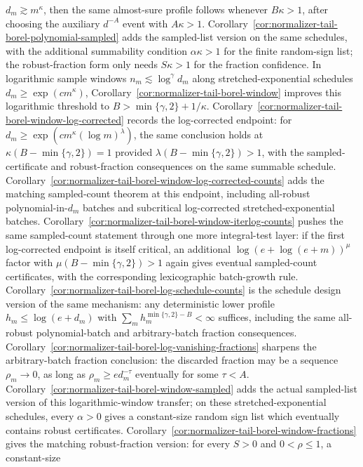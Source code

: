 \documentclass[11pt]{amsart}
\numberwithin{equation}{section}
\theoremstyle{definition}
\theoremstyle{remark}
\begin{document}
\(d_m\gtrsim m^\kappa\), then the same almost-sure profile follows whenever
\(B\kappa>1\), after choosing the auxiliary \(d^{-A}\) event with
\(A\kappa>1\).  Corollary~\ref{cor:normalizer-tail-borel-polynomial-sampled}
adds the sampled-list version on the same schedules, with the additional
summability condition \(\alpha\kappa>1\) for the finite random-sign list; the
robust-fraction form only needs \(S\kappa>1\) for the fraction confidence.  In
logarithmic sample windows \(n_m\lesssim\log^\gamma d_m\) along
stretched-exponential schedules \(d_m\ge\exp(c m^\kappa)\),
Corollary~\ref{cor:normalizer-tail-borel-window} improves this logarithmic
threshold to \(B>\min\{\gamma,2\}+1/\kappa\).
Corollary~\ref{cor:normalizer-tail-borel-window-log-corrected} records the
log-corrected endpoint: for
\(d_m\ge\exp(c m^\kappa(\log m)^\lambda)\), the same conclusion holds at
\(\kappa(B-\min\{\gamma,2\})=1\) provided
\(\lambda(B-\min\{\gamma,2\})>1\), with the sampled-certificate and
robust-fraction consequences on the same summable schedule.
Corollary~\ref{cor:normalizer-tail-borel-window-log-corrected-counts} adds the
matching sampled-count theorem at this endpoint, including all-robust
polynomial-in-\(d_m\) batches and subcritical log-corrected
stretched-exponential batches.
Corollary~\ref{cor:normalizer-tail-borel-window-iterlog-counts} pushes the same
sampled-count statement through one more integral-test layer:
if the first log-corrected endpoint is itself critical, an additional
\(\log(e+\log(e+m))^\mu\) factor with \(\mu(B-\min\{\gamma,2\})>1\) again gives
eventual sampled-count certificates, with the corresponding lexicographic
batch-growth rule.
Corollary~\ref{cor:normalizer-tail-borel-log-schedule-counts} is the schedule
design version of the same mechanism: any deterministic lower profile
\(h_m\le\log(e+d_m)\) with
\(\sum_m h_m^{\min\{\gamma,2\}-B}<\infty\) suffices, including the same
all-robust polynomial-batch and arbitrary-batch fraction consequences.
Corollary~\ref{cor:normalizer-tail-borel-log-vanishing-fractions} sharpens the
arbitrary-batch fraction conclusion: the discarded fraction may be a sequence
\(\rho_m\to0\), as long as \(\rho_m\ge e d_m^{-\tau}\) eventually for some
\(\tau<A\).
Corollary~\ref{cor:normalizer-tail-borel-window-sampled} adds the actual
sampled-list version of this logarithmic-window transfer; on these
stretched-exponential schedules, every \(\alpha>0\) gives a constant-size random
sign list which eventually contains robust certificates.
Corollary~\ref{cor:normalizer-tail-borel-window-fractions} gives the matching
robust-fraction version: for every \(S>0\) and \(0<\rho\le1\), a constant-size
\end{document}
